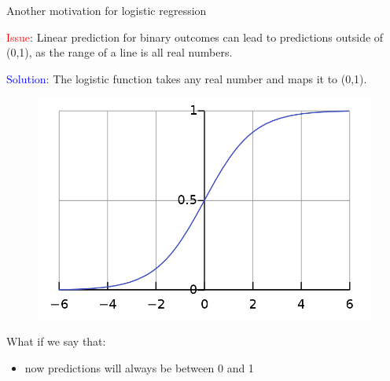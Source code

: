 \documentclass[10pt,t]{beamer}
\begin{document}
\begin{frame}{Another motivation for logistic regression}
	
	\vspace{-5 mm}
	
	\textcolor{red}{Issue}: Linear prediction for binary outcomes can lead to predictions outside of (0,1), as the range of a line is all real numbers.
	
	\medskip
	
	\textcolor{blue}{Solution}: The logistic function takes any real number and maps it to (0,1). 
	
	\begin{figure}
		\centering
		\includegraphics[scale = 0.15]{figs/logistic_curve}
	\end{figure}
	
	What if we say that: 
	\bigskip
	
	
	\begin{itemize}
		\item now predictions will always be between 0 and 1
		\medskip
		

\end{itemize}
\end{frame}
\end{document}
